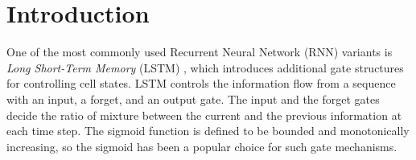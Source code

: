 \documentclass[letterpaper]{article} %
\begin{document}
\section{Introduction}
One of the most commonly used Recurrent Neural Network (RNN) variants is \textit{Long Short-Term Memory} (LSTM) \cite{hochreiter1997long}, which introduces additional gate structures for controlling cell states. LSTM controls the information flow from a sequence with an input, a forget, and an output gate. The input and the forget gates decide the ratio of mixture between the current and the previous information at each time step.
The sigmoid function is defined to be bounded and monotonically increasing, so the sigmoid has been a popular choice for such gate mechanisms.
\end{document}
